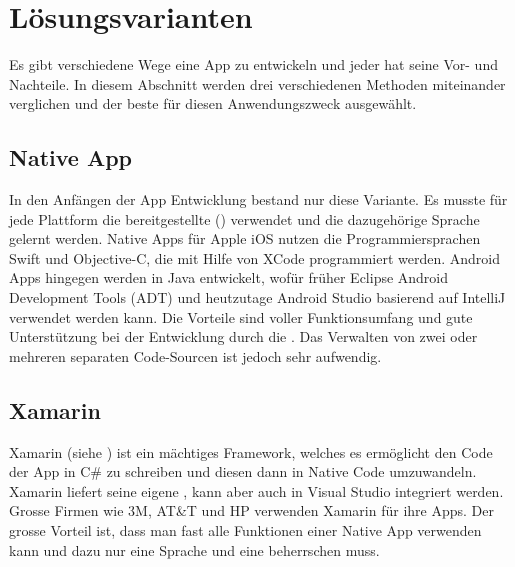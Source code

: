 \newpage
\section{Lösungsvarianten}\label{loesungsvarianten}
Es gibt verschiedene Wege eine App zu entwickeln und jeder hat seine Vor- und Nachteile. In diesem Abschnitt werden drei verschiedenen Methoden miteinander verglichen und der beste für diesen Anwendungszweck ausgewählt.

\subsection{Native App}\label{architektur_native}
In den Anfängen der App Entwicklung bestand nur diese Variante. Es musste für jede Plattform die bereitgestellte  () verwendet und die dazugehörige Sprache gelernt werden. Native Apps für Apple iOS nutzen die Programmiersprachen Swift und Objective-C, die mit Hilfe von XCode programmiert werden. Android Apps hingegen werden in Java entwickelt, wofür früher Eclipse Android Development Tools (ADT) und heutzutage Android Studio basierend auf IntelliJ verwendet werden kann. Die Vorteile sind voller Funktionsumfang und gute Unterstützung bei der Entwicklung durch die . Das Verwalten von zwei oder mehreren separaten Code-Sourcen ist jedoch sehr aufwendig.

\subsection{Xamarin}\label{architektur_xamarin}
Xamarin (siehe \cite{xamarin}) ist ein mächtiges Framework, welches es ermöglicht den Code der App in C\# zu schreiben und diesen dann in Native Code umzuwandeln. Xamarin liefert seine eigene , kann aber auch in Visual Studio integriert werden. Grosse Firmen wie 3M, AT\&T und HP verwenden Xamarin für ihre Apps. Der grosse Vorteil ist, dass man fast alle Funktionen einer Native App verwenden kann und dazu nur eine Sprache und eine  beherrschen muss. 

